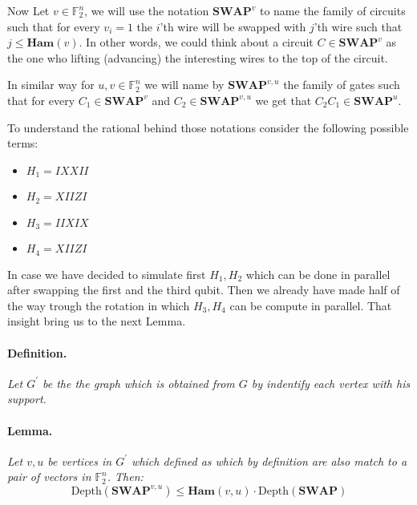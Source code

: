\documentclass{article}
\begin{document}
\begin{multicols*}{2}
Now Let \(v \in \mathbb{F}_{2}^{n}\), we will use the notation \( \textbf{SWAP}^{v} \) to name the family of circuits such that for every \(v_i =1\) the \(i\)'th wire will be swapped with \(j\)'th wire such that \(j \le \textbf{Ham}(v)\). In other words, we could think about a circuit \(C \in \textbf{SWAP}^{v}\) as the one who lifting (advancing) the interesting wires to the top of the circuit.  

In similar way for \(u,v \in \mathbb{F}_{2}^{n}\) we will name by \( \textbf{SWAP}^{v,u} \) the family of gates such that for every \( C_{1} \in \textbf{SWAP}^{v}\) and \( C_{2} \in \textbf{SWAP}^{v,u} \) we get that \(C_{2}C_{1} \in \textbf{SWAP}^{u}\).

To understand the rational behind those notations consider the following  possible terms:
\begin{itemize}
    \item \(H_{1} = I  X  X  I  I \)
    \item \(H_{2} = X  I  I  Z  I \)
    \item \(H_{3} = I  I  X  I  X \)
    \item \(H_{4} = X  I  I  Z  I \)
\end{itemize} In case we have decided to simulate first \(H_{1},H_{2}\) which can be done in parallel after swapping the first and the third qubit. Then we already have made half of the way trough the rotation in which \(H_{3},H_{4}\) can be compute in parallel. That insight bring us to the next Lemma.     
\paragraph{Definition.} \textit{ Let $G^\prime$ be the the graph which is obtained from $G$ by indentify each vertex with his support. }
\paragraph{Lemma.} \textit{ Let \(v,u\) be vertices in \(G^{\prime}\) which defined as   which by definition are also match to a pair of vectors in \(\mathbb{F}_2^{n} \). Then:} 
\begin{equation*}
  \text{Depth}\left(\textbf{SWAP}^{v,u}\right) \le \textbf{Ham}(v,u)\cdot \text{Depth}\left(\textbf{SWAP}\right)
\end{equation*}


\end{multicols*}
\end{document}
